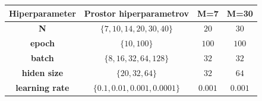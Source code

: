 \documentclass[12pt]{article}
\begin{document}
\begin{center}
    \begin{tabular}{|c|c|c|c|}
        \hline
        \textbf{Hiperparameter} & \textbf{Prostor hiperparametrov} &  \textbf{M=7} & \textbf{M=30}\\
        \hline
        \textbf{N} & $\{7,10,14,20,30,40\}$ & $20$ & $30$\\
        \hline
        \textbf{epoch} & $\{10,100\}$ & $100$ & $100$\\
        \hline
        \textbf{batch} & $\{8,16,32,64, 128\}$ & $32$ & $32$\\
        \hline
        \textbf{hiden size} & $\{20,32,64\}$ & $32$ & $64$\\
        \hline
        \textbf{learning rate} & $\{0.1,0.01,0.001,0.0001\}$ & $0.001$ & $0.001$\\
        \hline
    \end{tabular}
\end{center}
\end{document}
